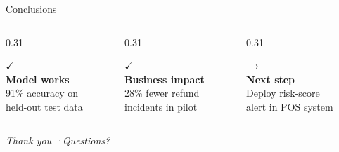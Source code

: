 \documentclass[aspectratio=169]{beamer}
\begin{document}
\begin{frame}{Conclusions}

  \vspace{0.5em}
  \begin{columns}[T]

    \begin{column}{0.31\textwidth}
      \colorbox{deepblue}{\parbox{\linewidth}{%
        \vspace{1.0em}
        \begin{center}
          {\color{okgreen}\Large\(\checkmark\)}\\[0.5em]
          {\color{white}\small\textbf{Model works}}\\[0.4em]
          {\color{lightblue}\footnotesize 91\% accuracy on\\held-out test data}
        \end{center}
        \vspace{1.0em}
      }}
    \end{column}

    \begin{column}{0.31\textwidth}
      \colorbox{deepblue}{\parbox{\linewidth}{%
        \vspace{1.0em}
        \begin{center}
          {\color{okgreen}\Large\(\checkmark\)}\\[0.5em]
          {\color{white}\small\textbf{Business impact}}\\[0.4em]
          {\color{lightblue}\footnotesize 28\% fewer refund\\incidents in pilot}
        \end{center}
        \vspace{1.0em}
      }}
    \end{column}

    \begin{column}{0.31\textwidth}
      \colorbox{deepblue}{\parbox{\linewidth}{%
        \vspace{1.0em}
        \begin{center}
          {\color{accent}\Large\(\rightarrow\)}\\[0.5em]
          {\color{white}\small\textbf{Next step}}\\[0.4em]
          {\color{lightblue}\footnotesize Deploy risk-score\\alert in POS system}
        \end{center}
        \vspace{1.0em}
      }}
    \end{column}

  \end{columns}

  \vfill
  \begin{center}
    \textit{\color{gray} Thank you \quad·\quad Questions?}
  \end{center}

\end{frame}

\end{document}
